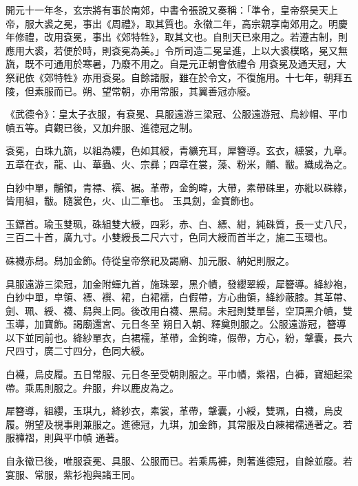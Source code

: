 \begin{pinyinscope}
 開元十一年冬，玄宗將有事於南郊，中書令張說又奏稱：「準令，皇帝祭昊天上帝，服大裘之冕，事出《周禮》，取其質也。永徽二年，高宗親享南郊用之。明慶年修禮，改用袞冕，事出《郊特牲》，取其文也。自則天已來用之。若遵古制，則應用大裘，若便於時，則袞冕為美。」令所司造二冕呈進，上以大裘樸略，冕又無旒，既不可通用於寒暑，乃廢不用之。自是元正朝會依禮令
 用袞冕及通天冠，大祭祀依《郊特牲》亦用袞冕。自餘諸服，雖在於令文，不復施用。十七年，朝拜五陵，但素服而已。朔、望常朝，亦用常服，其翼善冠亦廢。



 《武德令》：皇太子衣服，有袞冕、具服遠游三梁冠、公服遠游冠、烏紗帽、平巾幘五等。貞觀已後，又加弁服、進德冠之制。



 袞冕，白珠九旒，以組為纓，色如其綬，青纊充耳，犀簪導。玄衣，纁裳，九章。五章在衣，龍、山、華蟲、火、宗彞；四章在裳，藻、粉米，黼、黻。織成為之。



 白紗中單，黼領，青褾、襈、裾。革帶，金鉤暐，大帶，素帶硃里，亦紕以硃綠，皆用組，黻。隨裳色，火、山二章也。
 玉具劍，金寶飾也。



 玉鏢首。瑜玉雙珮，硃組雙大綬，四彩，赤、白、縹、紺，純硃質，長一丈八尺，三百二十首，廣九寸。小雙綬長二尺六寸，色同大綬而首半之，施二玉環也。



 硃襪赤舄。舄加金飾。侍從皇帝祭祀及謁廟、加元服、納妃則服之。



 具服遠游三梁冠，加金附蟬九首，施珠翠，黑介幘，發纓翠綏，犀簪導。絳紗袍，白紗中單，皁領、褾、襈、裙，白裙襦，白假帶，方心曲領，絳紗蔽膝。其革帶、劍、珮、綬、襪、舄與上同。後改用白襪、黑舄。未冠則雙單髻，空頂黑介幘，雙玉導，加寶飾。謁廟還宮、元日冬至
 朔日入朝、釋奠則服之。公服遠游冠，簪導以下並同前也。絳紗單衣，白裙襦，革帶，金鉤暐，假帶，方心，紛，鞶囊，長六尺四寸，廣二寸四分，色同大綬。



 白襪，烏皮履。五日常服、元日冬至受朝則服之。平巾幘，紫褶，白褲，寶細起梁帶。乘馬則服之。弁服，弁以鹿皮為之。



 犀簪導，組纓，玉琪九，絳紗衣，素裳，革帶，鞶囊，小綬，雙珮，白襪，烏皮履。朔望及視事則兼服之。進德冠，九琪，加金飾，其常服及白練裙襦通著之。若服褲褶，則與平巾幘
 通著。



 自永徽已後，唯服袞冕、具服、公服而已。若乘馬褲，則著進德冠，自餘並廢。若宴服、常服，紫衫袍與諸王同。




\end{pinyinscope}
